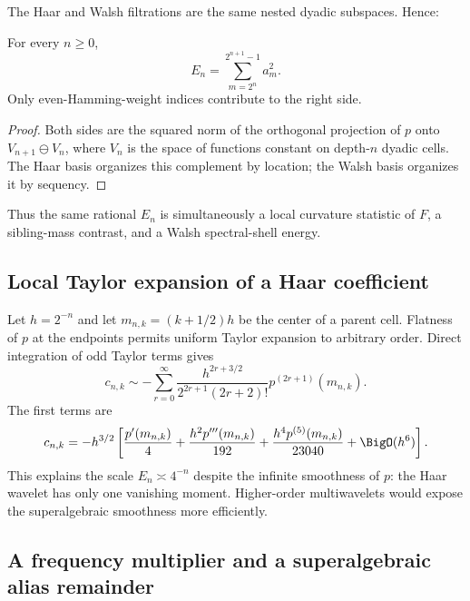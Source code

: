 \documentclass[11pt]{article}
\theoremstyle{definition}
\theoremstyle{remark}
\begin{document}
The Haar and Walsh filtrations are the same nested dyadic subspaces.  Hence:

\begin{proposition}
\label{p3:prop:Haar-Walsh-shell}
For every $n\ge0$,
\begin{equation}\label{p3:eq:Haar-Walsh-energy}
 E_n=\sum_{m=2^n}^{2^{n+1}-1}a_m^2.
\end{equation}
Only even-Hamming-weight indices contribute to the right side.
\end{proposition}

\begin{proof}
Both sides are the squared norm of the orthogonal projection of $p$ onto
$V_{n+1}\ominus V_n$, where $V_n$ is the space of functions constant on
depth-$n$ dyadic cells.  The Haar basis organizes this complement by location;
the Walsh basis organizes it by sequency.
\end{proof}

Thus the same rational $E_n$ is simultaneously a local curvature statistic of
$F$, a sibling-mass contrast, and a Walsh spectral-shell energy.

\subsection{Local Taylor expansion of a Haar coefficient}

Let $h=2^{-n}$ and let $m_{n,k}=(k+1/2)h$ be the center of a parent cell.
Flatness of $p$ at the endpoints permits uniform Taylor expansion to arbitrary
order.  Direct integration of odd Taylor terms gives
\begin{equation}\label{p3:eq:c-local-asymptotic}
 c_{n,k}\sim-
 \sum_{r=0}^\infty
 \frac{h^{2r+3/2}}{2^{2r+1}(2r+2)!}
 p^{(2r+1)}(m_{n,k}).
\end{equation}
The first terms are
\begin{equation}\label{p3:eq:c-local-first}
 c_{n,k}=-h^{3/2}\left[
 \frac{p'(m_{n,k})}{4}
 +\frac{h^2p'''(m_{n,k})}{192}
 +\frac{h^4p^{(5)}(m_{n,k})}{23040}
 +\BigO(h^6)
 \right].
\end{equation}
This explains the scale $E_n\asymp4^{-n}$ despite the infinite smoothness of
$p$: the Haar wavelet has only one vanishing moment.  Higher-order multiwavelets
would expose the superalgebraic smoothness more efficiently.

\subsection{A frequency multiplier and a superalgebraic alias remainder}
\end{document}
